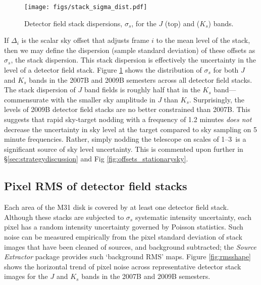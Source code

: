 \documentclass[iop]{emulateapj}
\newcommand{\sw}[1]{\textit{#1}} %
\begin{document}
\begin{figure}[p]
    \centering
        \texttt{[image: figs/stack\_sigma\_dist.pdf]}
    \caption[Detector field stack dispersions, $\sigma_s$]{Detector field stack dispersions, $\sigma_s$, for the $J$ (top) and ($K_s$) bands.}
    \label{fig:sigma_stack}
\end{figure}


If $\Delta_i$ is the scalar sky offset that adjusts frame $i$ to the mean level of the stack, then we may define the dispersion (sample standard deviation) of these offsets as $\sigma_s$, the stack dispersion.
% 
% 
This stack dispersion is effectively the uncertainty in the level of a detector field stack. Figure \ref{fig:sigma_stack} shows the distribution of $\sigma_s$ for both $J$ and $K_s$ bands in the 2007B and 2009B semesters across all detector field stacks. The stack dispersion of $J$ band fields is roughly half that in the $K_s$ band---commensurate with the smaller sky amplitude in $J$ than $K_s$. Surprisingly, the levels of 2009B detector field stacks are no better constrained than 2007B. This suggests that rapid sky-target nodding with a frequency of 1.2 minutes \emph{does not} decrease the uncertainty in sky level at the target compared to sky sampling on 5 minute frequencies. Rather, simply nodding the telescope on scales of 1\arcdeg--3\arcdeg\ is a significant source of sky level uncertainty. This is commented upon further in \S \ref{sec:strategydiscussion} and Fig \ref{fig:offsets_stationarysky}.

\subsection{Pixel RMS of detector field stacks}

Each area of the M31 disk is covered by at least one detector field stack. Although these stacks are subjected to $\sigma_s$ systematic intensity uncertainty, each pixel has a random intensity uncertainty governed by Poisson statistics. Such noise can be measured empirically from the pixel standard deviation of stack images that have been cleaned of sources, and background subtracted; the \sw{Source Extractor} package \citep{Bertin:1996} provides such `background RMS' maps. Figure \ref{fig:rmsshape} shows the horizontal trend of pixel noise across representative detector stack images for the $J$ and $K_s$ bands in the 2007B and 2009B semesters.
\end{document}

